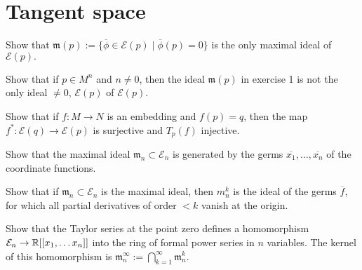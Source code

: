 \chapter{Tangent space}

\begin{problem}{1}
Show that $\mathfrak m(p):= \{\overline{\phi} \in \mathcal{E}(p) \mid \overline{\phi}(p) = 0 \}$ is the only maximal ideal of $\mathcal{E}(p).$
\end{problem}


\begin{problem}{2}
Show that if $p \in M^n$ and $n\neq 0$, then the ideal $\mathfrak m (p)$ in exercise 1 is not the only ideal $\neq 0$, $\mathcal{E}(p)$ of $\mathcal{E}(p).$
\end{problem}

\begin{problem}{3}
Show that if $f: M \rightarrow N$ is an embedding and $f(p) = q$, then the map $f^\ast: \mathcal{E}(q) \rightarrow \mathcal{E}(p)$ is surjective and $T_p(f)$ injective.
\end{problem}

\begin{problem}{4}
Show that the maximal ideal $\mathfrak m_n \subset \mathcal{E}_n$ is generated by the germs $\overline{x_1}, \ldots, \overline{x_n}$ of the coordinate functions. 
\end{problem}

\begin{problem}{5}
Show that if $\mathfrak m_n \subset \mathcal{E}_n$ is the maximal ideal, then $m_n^k$ is the ideal of the germs $\overline{f}$, for which all partial derivatives of order $<k$ vanish at the origin.
\end{problem}

\begin{problem}{6}
Show that the Taylor series at the point zero defines a homomorphism $\mathcal{E}_n \rightarrow \mathbb{R}[[x_1, \ldots x_n]]$ into the ring of formal power series in $n$ variables. The kernel of this homomorphism is $\mathfrak m_n^\infty:= \bigcap_{k=1}^\infty \mathfrak m_n^k$.
\end{problem}

\begin{problem}{7}

\end{problem}

\begin{problem}{8}

\end{problem}

\begin{problem}{9}

\end{problem}

\begin{problem}{10}

\end{problem}

\begin{problem}{1}

\end{problem}

\begin{problem}{1}

\end{problem}